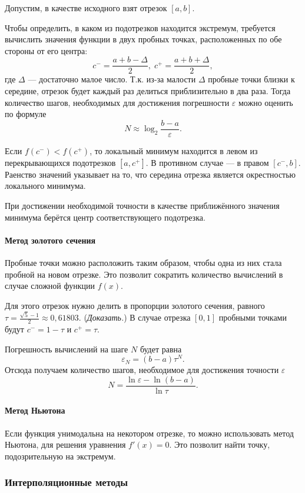Допустим, в качестве исходного взят отрезок $[a,b]$. 

Чтобы определить, в каком из подотрезков находится экстремум, требуется
вычислить значения функции в двух пробных точках, расположенных по
обе стороны от его центра:
\[
c^{-}=\frac{a+b-\Delta}{2},\; c^{+}=\frac{a+b+\Delta}{2},
\]
где $\Delta$ — достаточно малое число. Т.к. из-за малости $\Delta$
пробные точки близки к середине, отрезок будет каждый раз делиться
приблизительно в два раза. Тогда количество шагов, необходимых для
достижения погрешности $\varepsilon$ можно оценить по формуле
\[
N\approx\log_{2}\frac{b-a}{\varepsilon}.
\]


Если $f(c^{-})<f(c^{+})$, то локальный минимум находится в левом
из перекрывающихся подотрезков $[a,c^{+}]$. В противном случае —
в правом $[c^{-},b]$. Раенство значений указывает на то, что середина
отрезка является окрестностью локального минимума.

При достижении необходимой точности в качестве приближённого значения
минимума берётся центр соответствующего подотрезка.


\paragraph{Метод золотого сечения}

Пробные точки можно расположить таким образом, чтобы одна из них стала
пробной на новом отрезке. Это позволит сократить количество вычислений
в случае сложной функции $f(x).$

Для этого отрезок нужно делить в пропорции золотого сечения, равного
$\tau=\frac{\sqrt{5}-1}{2}\approx0{,}61803.$ (\emph{Доказать.}) В
случае отрезка $[0,1]$ пробными точками будут $c^{-}=1-\tau$ и $c^{+}=\tau$.

Погрешность вычислений на шаге $N$ будет равна
\[
\varepsilon_{N}=(b-a)\tau^{N}.
\]
Отсюда получаем количество шагов, необходимое для достижения точности
$\varepsilon$
\[
N=\frac{\ln\varepsilon-\ln(b-a)}{\ln\tau}.
\]



\paragraph{Метод Ньютона}

Если функция унимодальна на некотором отрезке, то можно использовать
метод Ньютона, для решения уравнения $f'(x)=0.$ Это позволит найти
точку, подозрительную на экстремум.


\subsubsection{Интерполяционные методы}

